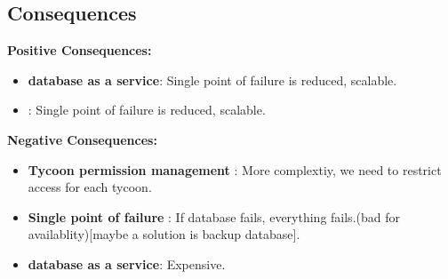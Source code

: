 \subsection*{Consequences}
\textbf{Positive Consequences:}
\begin{itemize}
    \item \textbf{database as a service}: Single point of failure is reduced, scalable.
    \item \textbf{}: Single point of failure is reduced, scalable.
\end{itemize}
\textbf{Negative Consequences:}
\begin{itemize}
    \item \textbf{Tycoon permission management} : More complextiy, we need to restrict access for each tycoon.
    \item \textbf{Single point of failure} : If database fails, everything fails.(bad for availablity)[maybe a solution is backup database].
    \item \textbf{database as a service}: Expensive.
\end{itemize}